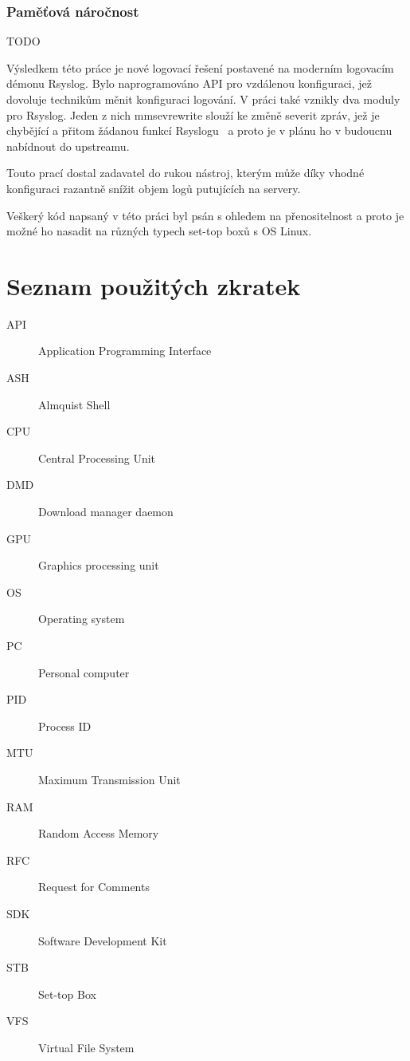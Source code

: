 \documentclass[thesis=B,czech]{FITthesis}[2012/06/26]
\begin{document}
\subsection{Paměťová náročnost}
TODO

\begin{conclusion}
Výsledkem této práce je nové logovací řešení postavené na moderním logovacím démonu Rsyslog. Bylo naprogramováno API pro vzdálenou konfiguraci, jež dovoluje technikům měnit konfiguraci logování. V práci také vznikly dva moduly pro Rsyslog. Jeden z nich mmsevrewrite slouží ke změně severit zpráv, jež je chybějící a přitom žádanou funkcí Rsyslogu~\cite{rsysMailingList} a proto je v plánu ho v budoucnu nabídnout do upstreamu.

Touto prací dostal zadavatel do rukou nástroj, kterým může díky vhodné konfiguraci razantně snížit objem logů putujících na servery.

Veškerý kód napsaný v této práci byl psán s ohledem na přenositelnost a proto je možné ho  nasadit na různých typech set-top boxů s OS Linux.

\end{conclusion}




\appendix

\chapter{Seznam použitých zkratek}
\begin{description}
	\item[API] Application Programming Interface
	\item[ASH] Almquist Shell
	\item[CPU] Central Processing Unit
	\item[DMD] Download manager daemon
	\item[GPU] Graphics processing unit
	\item[OS] Operating system
	\item[PC] Personal computer
	\item[PID] Process ID
	\item[MTU] Maximum Transmission Unit
	\item[RAM] Random Access Memory
	\item[RFC] Request for Comments
	\item[SDK] Software Development Kit
	\item[STB] Set-top Box
	\item[VFS] Virtual File System
\end{description}
\end{document}
